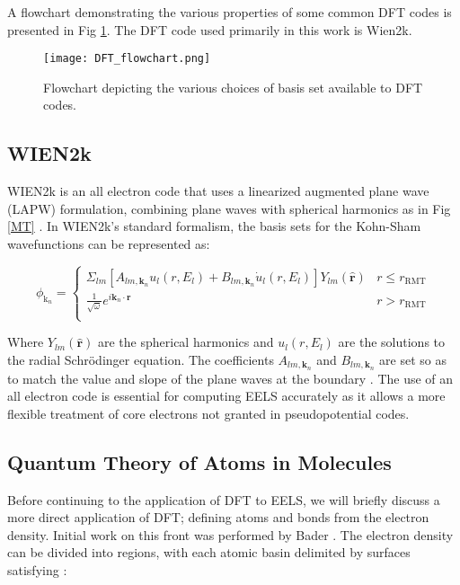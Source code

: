 A flowchart demonstrating the various properties of some common DFT codes is presented in Fig \ref{dft-flowchart}.  The DFT code used primarily in this work is Wien2k.

\begin{figure}
	\centering
	\texttt{[image: DFT\_flowchart.png]}
	\caption{Flowchart depicting the various choices of basis set available to DFT codes.}
	\label{dft-flowchart}
\end{figure}


\subsection{WIEN2k}
WIEN2k is an all electron code that uses a linearized augmented plane wave (LAPW) formulation, combining plane waves with spherical harmonics as in Fig \ref{MT} \cite{wien2k}.   In WIEN2k's standard formalism, the basis sets for the Kohn-Sham wavefunctions can be represented as: 

\begin{equation}
	\phi_{\mathrm{k}_n} = 
	\begin{cases}
	\Sigma_{lm} [A_{lm,\textbf{k}_n}u_l(r,E_l) + B_{lm,\textbf{k}_n}\dot{u}_l(r,E_l)]Y_{lm}(\hat{\textbf{r}}) & r \leq r_{\mathrm{RMT}} \\
	\frac{1}{\sqrt{\omega}}e^{i\textbf{k}_n \cdot \textbf{r}} & r> r_{\mathrm{RMT}} \\
	\end{cases}
\end{equation}

Where $Y_{lm}(\hat{\textbf{r}})$ are the spherical harmonics and $u_l(r,E_l)$ are the solutions to the radial Schr\"odinger equation.  The coefficients $A_{lm,\textbf{k}_n}$ and $B_{lm,\textbf{k}_n}$ are set so as to match the value and slope of the plane waves at the boundary \cite{wien2k}.  The use of an all electron code is essential for computing EELS accurately as it allows a more flexible treatment of core electrons not granted in pseudopotential codes. 
 


\subsection{Quantum Theory of Atoms in Molecules} \label{bader-theory}
Before continuing to the application of DFT to EELS, we will briefly discuss a more direct application of DFT; defining atoms and bonds from the electron density. Initial work on this front was performed by Bader \cite{bader}. The electron density can be divided into regions, with each atomic basin  delimited by surfaces satisfying \cite{bader_quantum_1991}: 


